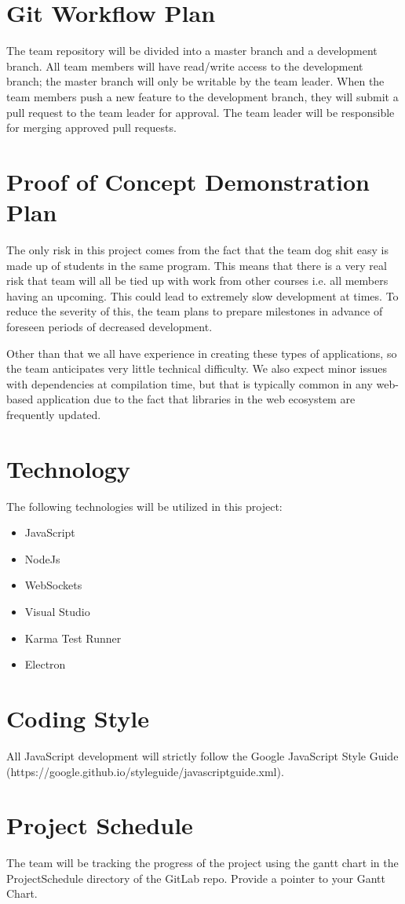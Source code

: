 \documentclass{article}
\begin{document}
\section{Git Workflow Plan}
The team repository will be divided into a master branch and a development branch. All team members will have read/write access to the development branch; the master branch will only be writable by the team leader. When the team members push a new feature to the development branch, they will submit a pull request to the team leader for approval. The team leader will be responsible for merging approved pull requests.

\section{Proof of Concept Demonstration Plan}
The only risk in this project comes from the fact that the team dog shit easy is made up of students in the same program. This means that there is a very real risk that team will all be tied up with work from other courses i.e. all members having an upcoming. This could lead to extremely slow development at times. To reduce the severity of this, the team plans to prepare milestones in advance of foreseen periods of decreased development. 

Other than that we all have experience in creating these types of applications, so the team anticipates very little technical difficulty. We also expect minor issues with dependencies at compilation time, but that is typically common in any web-based application due to the fact that libraries in the web ecosystem are frequently updated. 


\section{Technology}
The following technologies will be utilized in this project: 
\begin{itemize}
    \item JavaScript
    \item NodeJs
    \item WebSockets
    \item Visual Studio
    \item Karma Test Runner
    \item Electron
\end{itemize}

\section{Coding Style}
All JavaScript development will strictly follow the Google JavaScript Style Guide (https://google.github.io/styleguide/javascriptguide.xml).

\section{Project Schedule}
The team will be tracking the progress of the project using the gantt chart in the ProjectSchedule directory of the GitLab repo.
Provide a pointer to your Gantt Chart.

\end{document}
